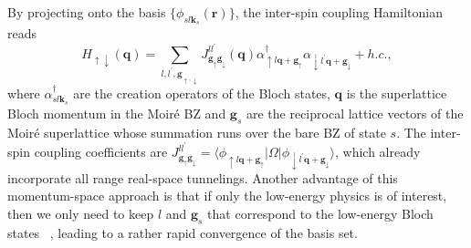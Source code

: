 \documentclass[twocolumn,english,prl,floatfix,citeautoscript,nofootinbib]{revtex4}
\begin{document}
By projecting onto the %
basis $\{\phi _{sl\mathbf{k}_{s}}(\mathbf{r})\}$, the inter-spin coupling
Hamiltonian %
reads~\cite{SM} %
\begin{equation}
H_{\uparrow \downarrow }(\mathbf{q})=\sum_{l,l^{\prime },\mathbf{g}%
_{\uparrow ,\downarrow }}J_{\mathbf{g}_{\uparrow }\mathbf{g}_{\downarrow
}}^{ll^{\prime }}(\mathbf{q})\alpha _{\uparrow l\mathbf{q}+\mathbf{g}%
_{\uparrow }}^{\dag }\alpha _{\downarrow l^{\prime }\mathbf{q}+\mathbf{g}%
_{\downarrow }}+h.c.,
\end{equation}%
where $\alpha _{sl\mathbf{k}_{s}}^{\dag }$ are the creation operators of the
Bloch states, $\mathbf{q}$ is the superlattice Bloch momentum in the Moir\'{e%
} BZ and $\mathbf{g}_{s}$ are the reciprocal lattice vectors of the Moir\'{e}
superlattice whose summation runs over the bare BZ of state $s$. The
inter-spin coupling coefficients are $J_{\mathbf{g}_{\uparrow }\mathbf{g}%
_{\downarrow }}^{ll^{\prime }}=\langle \phi _{\uparrow l\mathbf{q}+\mathbf{g}%
_{\uparrow }}|\Omega |\phi _{\downarrow l^{\prime }\mathbf{q}+\mathbf{g}%
_{\downarrow }}\rangle $, which already incorporate all range real-space
tunnelings. Another advantage of this momentum-space approach is that if
only the low-energy physics is of interest, then we only need to keep $l$
and $\mathbf{g}_{s}$ that correspond to the low-energy Bloch states~\cite%
{PhysRevLett.99.256802,PhysRevB.81.165105,PNAS.108.12233,PhysRevB.86.155449}%
, leading to a rather rapid convergence of the basis set.
\end{document}
